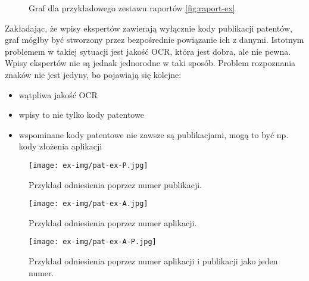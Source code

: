 \begin{figure}\centering
{}
\caption{Graf dla przykładowego zestawu raportów \cref{fig:raport-ex}}
\label{fig:raport-ex-G}
\end{figure}

Zakładając, że wpisy ekspertów zawierają wyłącznie kody publikacji 
patentów, graf mógłby być stworzony przez bezpośrednie powiązanie
ich z danymi. Istotnym problemem w takiej sytuacji jest jakość \ac{OCR},
która jest dobra, ale nie pewna.
Wpisy ekspertów nie są jednak jednorodne w taki sposób. Problem
rozpoznania znaków nie jest jedyny, bo pojawiają się kolejne:

\begin{itemize}
\item wątpliwa jakość \ac{OCR}
\item wpisy to nie tylko kody patentowe
\item wspominane kody patentowe nie zawsze są publikacjami,
      mogą to być np. kody złożenia aplikacji
\end{itemize}

\begin{figure}[H]\centering
\texttt{[image: ex-img/pat-ex-P.jpg]}
\caption{Przykład odniesienia poprzez numer publikacji.}
\end{figure}

\begin{figure}[H]\centering
\texttt{[image: ex-img/pat-ex-A.jpg]}
\caption{Przykład odniesienia poprzez numer aplikacji.}
\end{figure}

\begin{figure}[H]\centering
\texttt{[image: ex-img/pat-ex-A-P.jpg]}
\caption{Przykład odniesienia poprzez numer aplikacji i publikacji
         jako jeden numer.}
\end{figure}

